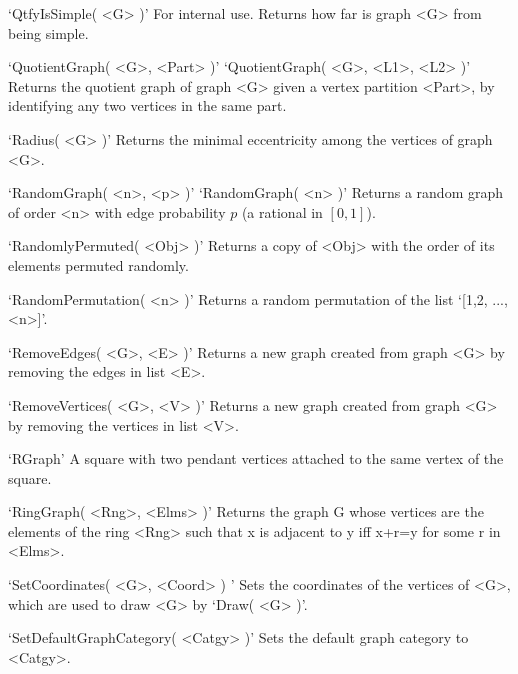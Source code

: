 `QtfyIsSimple( <G> )'\newline\hglue 5mm 
For internal use. Returns how far is graph <G> from being simple.

`QuotientGraph( <G>, <Part> )'\newline
`QuotientGraph( <G>, <L1>, <L2> )'\newline\hglue 5mm 
Returns the quotient graph of graph <G> given a vertex partition <Part>, by identifying any two vertices in the same part.

`Radius( <G> )'\newline\hglue 5mm 
Returns the minimal eccentricity among the vertices of graph <G>.

`RandomGraph( <n>, <p> )'\newline
`RandomGraph( <n> )'\newline\hglue 5mm 
Returns a random graph of order <n> with edge probability $p$ (a rational in $[0,1]$).

`RandomlyPermuted( <Obj> )'\newline\hglue 5mm 
Returns  a copy of <Obj> with the order of its elements permuted randomly.

`RandomPermutation( <n> )'\newline\hglue 5mm 
Returns a random permutation of the list `[1,2, ..., <n>]'.

`RemoveEdges( <G>, <E> )'\newline\hglue 5mm 
Returns  a  new graph created from graph <G> by removing the edges in list <E>.

`RemoveVertices( <G>, <V> )'\newline\hglue 5mm 
Returns  a  new  graph  created from graph <G> by removing the vertices in list <V>.

`RGraph'\newline\hglue 5mm 
A  square  with  two  pendant  vertices attached to the same vertex of the square.

`RingGraph( <Rng>, <Elms> )'\newline\hglue 5mm 
Returns  the  graph  G  whose  vertices are the elements of the ring <Rng>
such that x is adjacent to y iff x+r=y for some r in <Elms>.

`SetCoordinates( <G>, <Coord> ) '\newline\hglue 5mm 
Sets  the  coordinates  of the vertices of <G>, which are used to draw <G> by `Draw( <G> )'.

`SetDefaultGraphCategory( <Catgy> )'\newline\hglue 5mm 
Sets  the default graph category to <Catgy>.

